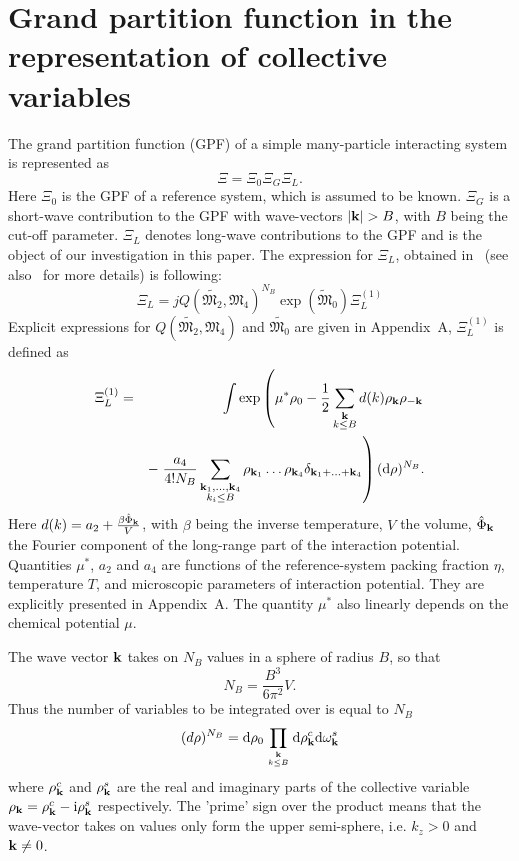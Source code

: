 \section{\label{sec:init-gpf} Grand partition function in the representation of collective variables}
The grand partition function (GPF) of a simple many-particle interacting system is represented as
\begin{equation}
	\label{Xi_as_prod}
	\Xi = \Xi_0\Xi_G\Xi_L.
\end{equation}
Here $\Xi_0$ is the GPF of a reference system, which is assumed to be known. $\Xi_G$ is a short-wave contribution to the GPF with wave-vectors $\abs{\vb{k}}>B$, with $B$ being the cut-off parameter.
$\Xi_L$ denotes long-wave contributions to the GPF and is the object of our investigation in this paper. The expression for $\Xi_L$, obtained in~\cite{RomaJPS2024} (see also~\cite{Roma2023Preprint} for more details) is following:
\begin{equation}
	\label{Xi_L}
	\Xi_L = jQ(\tilde{\mathfrak{M}_2}, \mathfrak{M}_4)^{N_B} \exp(\tilde{\mathfrak{M}}_0) \Xi_L^{(1)}
\end{equation} 
Explicit expressions for $Q(\tilde{\mathfrak{M}_2}, \mathfrak{M}_4)$ and $\tilde{\mathfrak{M}_0}$ are given in Appendix~A, $\Xi_L^{(1)}$ is defined as
\begin{eqnarray}
	\label{Xi_L_1}
	\Xi_L^{(1)} &=& 
	\int \exp\left(
	\mu^* \rho_0 - \frac{1}{2} \sum_{\substack{\vb k \\ k \leq B}} d(k) \rho_{\vb k} \rho_{-\vb k} 
	\right.\\
	&& -\left. \frac{a_4}{4! N_B} \sum_{\substack{\vb k_1, \dotsc, \vb k_4 \\ k_i \leq B}} \rho_{\vb k_1} \dotsc \rho_{\vb k_4} \delta_{\vb{k}_1 + \dotsc + \vb{k}_4} \right) ({\rm d} \rho)^{N_B}
	\nonumber.
\end{eqnarray}
Here $d(k) = a_2 + \frac{\beta\hat{\Phi}_{\vb k}}{V}$, with $\beta$ being the inverse temperature, $V$ the volume, $\hat{\Phi}_{\vb k}$ the Fourier component of the long-range part of the interaction potential.
Quantities $\mu^*$, $a_2$ and $a_4$ are functions of the reference-system packing fraction $\eta$, temperature $T$, and microscopic parameters of interaction potential. They are explicitly presented in Appendix~A. The quantity $\mu^*$ also linearly depends on the chemical potential $\mu$.

The wave vector $\vb k$ takes on $N_B$ values in a sphere of radius $B$, so that
\begin{equation}
	\label{NB}
	N_B = \frac{B^3}{6\pi^2}V.
\end{equation}
Thus the number of variables to be integrated over is equal to $N_B$
\begin{equation*}
	(d\rho)^{N_B} = {\rm d}\rho_0 \prod_{\vb k\atop k\le B} {\rm d}\rho_{\vb k}^c {\rm d}\omega_{\vb k}^s
\end{equation*}
where $\rho_{\vb k}^c$ and $\rho_{\vb k}^s$ are the real and imaginary parts of the collective variable $\rho_{\vb k} = \rho_{\vb k}^c - {\rm i} \rho_{\vb k}^s$ respectively. The 'prime' sign over the product means that the wave-vector takes on values only form the upper semi-sphere, i.e. $k_z > 0$ and $\vb k \neq 0$.

